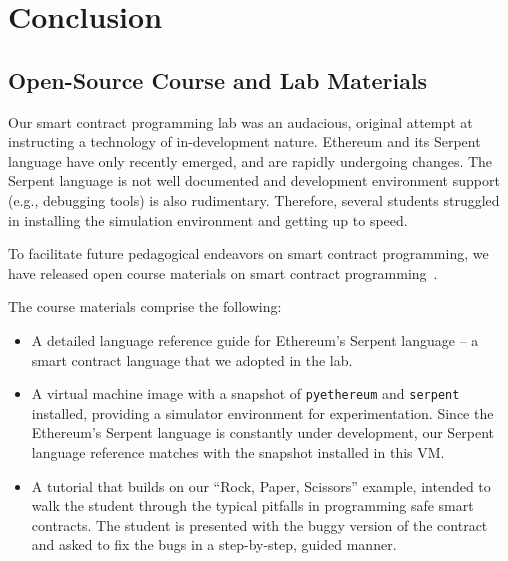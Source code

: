 \documentclass{llncs}
\newcommand{\elaine}[1]{}
\newcommand{\ignore}[1]{}
\begin{document}
\ignore{
\subsection{Fixed ``Rock, Paper, Scissors'' Contract} 
The full, fixed ``Rock, Paper, Scissors'' contract
is included in our open-source lab materials
available at 
~\cite{anonymousethlab}
}
\section{Conclusion}
\subsection{Open-Source Course and Lab Materials}
Our smart contract programming lab was an audacious, 
original attempt 
at instructing a technology of in-development nature.
Ethereum and its Serpent language
have only recently emerged, and are 
rapidly undergoing changes. 
The Serpent language is not well documented and development
environment support (e.g., debugging tools) 
is also rudimentary.
Therefore, several students struggled 
in installing the simulation environment and 
getting up to speed.

To facilitate future pedagogical endeavors on smart contract programming,
we have released open course materials on smart contract programming~\cite{anonymousethlab}.

The course materials comprise the following:
\begin{itemize}[leftmargin=5mm]
\item
A detailed language reference 
guide for Ethereum's Serpent language -- a
smart contract language that we adopted in the lab.
\item
A virtual machine image with a snapshot of {\tt pyethereum} and {\tt serpent} installed,
providing a simulator environment for experimentation.
Since the Ethereum's Serpent language is constantly
under development, our Serpent language
reference matches with the snapshot installed in this VM. 
\item
A tutorial that 
builds on our ``Rock, Paper, Scissors'' example, 
intended to 
walk the student through the typical pitfalls
in programming safe smart contracts.
The student is presented with the buggy version of the contract
and asked to fix the bugs in a step-by-step, guided manner.
\end{itemize}
\end{document}
